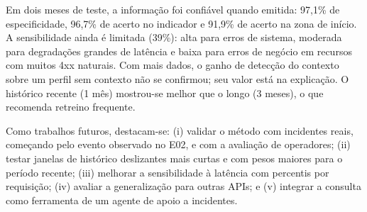 \documentclass[sigconf,nonacm]{acmart}
\begin{document}
Em dois meses de teste, a informação foi confiável quando emitida: 97,1\% de especificidade, 96,7\% de acerto no indicador e 91,9\% de acerto na zona de início. A sensibilidade ainda é limitada (39\%): alta para erros de sistema, moderada para degradações grandes de latência e baixa para erros de negócio em recursos com muitos 4xx naturais. Com mais dados, o ganho de detecção do contexto sobre um perfil sem contexto não se confirmou; seu valor está na explicação. O histórico recente (1 mês) mostrou-se melhor que o longo (3 meses), o que recomenda retreino frequente.

Como trabalhos futuros, destacam-se: (i) validar o método com incidentes reais, começando pelo evento observado no E02, e com a avaliação de operadores; (ii) testar janelas de histórico deslizantes mais curtas e com pesos maiores para o período recente; (iii) melhorar a sensibilidade à latência com percentis por requisição; (iv) avaliar a generalização para outras APIs; e (v) integrar a consulta como ferramenta de um agente de apoio a incidentes.



\end{document}
